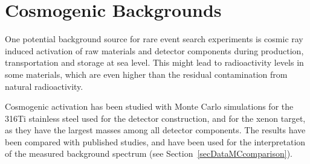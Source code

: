 \section{Cosmogenic Backgrounds}
\label{secCosmogenicBackgrounds}

One potential background source for rare event search experiments is cosmic ray induced activation of raw materials and detector components during production, transportation and storage at sea level. This might lead to radioactivity levels in some materials, which are even higher than the residual contamination from natural radioactivity.

Cosmogenic activation has been studied with Monte Carlo simulations for the 316Ti stainless steel used for the detector construction, and for the xenon target, as they have the largest masses among all detector components. The results have been compared with  published studies, and have been used for the interpretation of the measured background spectrum (see Section~\ref{secDataMCcomparison}).

